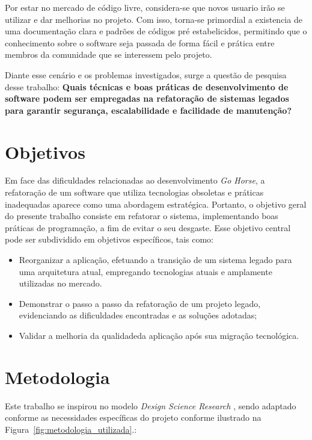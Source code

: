     Por estar no mercado de código livre, considera-se que novos usuario irão se utilizar e dar melhorias no projeto. Com isso, torna-se primordial a existencia de uma documentação clara e padrões de códigos pré estabelicidos, permitindo que o conhecimento sobre o software seja passada de forma fácil e prática entre membros da comunidade que se interessem pelo projeto.\cite[]{souza2010contribuiccao}

    Diante esse cenário e os problemas investigados, surge a questão de pesquisa desse trabalho: \textbf{Quais técnicas e boas práticas de desenvolvimento de software podem ser empregadas na refatoração de sistemas legados para garantir segurança, escalabilidade e facilidade de manutenção?}

    \section{Objetivos}
    \label{subsec:objetivos}

    Em face das dificuldades relacionadas ao desenvolvimento \textit{Go Horse}, a refatoração de um software que utiliza tecnologias obsoletas e práticas inadequadas aparece como uma abordagem estratégica. Portanto, o objetivo geral do presente trabalho consiste em refatorar o sistema, implementando boas práticas de programação, a fim de evitar o seu desgaste. Esse objetivo central pode ser subdividido em objetivos específicos, tais como:

    \begin{itemize}
        \item Reorganizar a aplicação, efetuando a transição de um sistema legado para uma arquitetura atual, empregando tecnologias atuais e amplamente utilizadas no mercado.
        \item Demonstrar o passo a passo da refatoração de um projeto legado, evidenciando as dificuldades encontradas e as soluções adotadas;
        \item Validar a melhoria da qualidadeda aplicação após sua migração tecnológica.
    \end{itemize}


    \section{Metodologia}

    Este trabalho se inspirou no modelo \textit{Design Science Research} \cite[]{pimentel2020dsr}, sendo adaptado conforme as necessidades específicas do projeto conforme ilustrado na Figura~\ref{fig:metodologia_utilizada}.:

